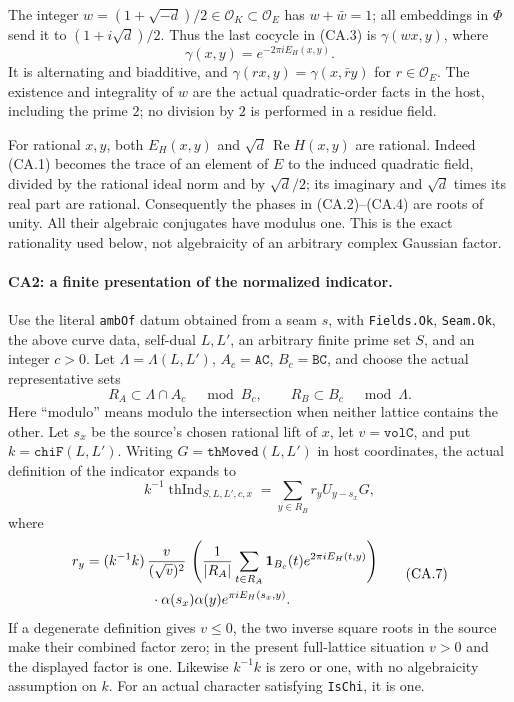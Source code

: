 The integer $w=(1+\sqrt{-d})/2\in\mathcal O_K\subset\mathcal O_E$
has $w+\bar w=1$; all embeddings in $\Phi$ send it to
$(1+i\sqrt d)/2$. Thus the last cocycle in (CA.3) is
$\gamma(wx,y)$, where
\[
 \gamma(x,y)=e^{-2\pi iE_H(x,y)}.
 \tag{CA.4}
\]
It is alternating and biadditive, and
$\gamma(rx,y)=\gamma(x,\bar r y)$ for $r\in\mathcal O_E$.
The existence and integrality of $w$ are the actual quadratic-order
facts in the host, including the prime $2$; no division by $2$ is
performed in a residue field.

For rational $x,y$, both $E_H(x,y)$ and $\sqrt d\,
\operatorname{Re}H(x,y)$ are rational. Indeed (CA.1) becomes the
trace of an element of $E$ to the induced quadratic field, divided
by the rational ideal norm and by $\sqrt d/2$; its imaginary and
$\sqrt d$ times its real part are rational. Consequently the phases
in (CA.2)--(CA.4) are roots of unity. All their algebraic conjugates
have modulus one. This is the exact rationality used below, not
algebraicity of an arbitrary complex Gaussian factor.

\paragraph{CA2: a finite presentation of the normalized indicator.}
Use the literal \texttt{ambOf} datum obtained from a seam $s$, with
\texttt{Fields.Ok}, \texttt{Seam.Ok}, the above curve data, self-dual
$L,L'$, an arbitrary finite prime set $S$, and an integer $c>0$.
Let $\Lambda=\Lambda(L,L')$, $A_c=\texttt{AC}$,
$B_c=\texttt{BC}$, and choose the actual representative sets
\[
 R_A\subset\Lambda\cap A_c\quad\bmod B_c,
 \qquad R_B\subset B_c\quad\bmod\Lambda.
 \tag{CA.5}
\]
Here ``modulo'' means modulo the intersection when neither lattice
contains the other. Let $s_x$ be the source's chosen rational lift of
$x$, let $v=\texttt{volC}$, and put $k=\texttt{chiF}(L,L')$.
Writing $G=\texttt{thMoved}(L,L')$ in host coordinates, the actual
definition of the indicator expands to
\[
 k^{-1}\operatorname{thInd}_{S,L,L',c,x}
       =\sum_{y\in R_B}r_yU_{y-s_x}G,
 \tag{CA.6}
\]
where
\[
\begin{split}
 r_y={}&(k^{-1}k)\,\frac{v}{(\sqrt v)^2}\,
 \left(\frac1{|R_A|}\sum_{t\in R_A}
       {\bf1}_{B_c}(t)e^{2\pi iE_H(t,y)}\right)\\
 &\hspace{12mm}\cdot\alpha(s_x)\alpha(y)
                      e^{\pi iE_H(s_x,y)}.
\end{split}
 \tag{CA.7}
\]
If a degenerate definition gives $v\le0$, the two inverse square
roots in the source make their combined factor zero; in the present
full-lattice situation $v>0$ and the displayed factor is one. Likewise
$k^{-1}k$ is zero or one, with no algebraicity assumption on $k$.
For an actual character satisfying \texttt{IsChi}, it is one.

